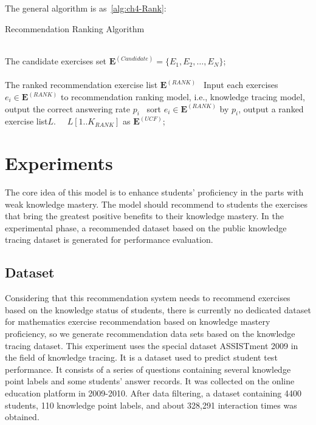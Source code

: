 The general algorithm is as~\ref{alg:ch4-Rank}:
\begin{algorithm}[h]
  \caption{Recommendation Ranking Algorithm}\label{alg:ch4-Rank}
  \begin{algorithmic}
    \REQUIRE~~\\

    The candidate exercises set \(\mathbf{E}^{(Candidate)}=\{E_1,E_2,\ldots,E_N\} \); \\
    \ENSURE~~\\ %
    The ranked recommendation exercise list \(\mathbf{E}^{(RANK)} \)
    \STATE~Input each exercises \(e_i \in \mathbf{E}^{(RANK)} \) to recommendation ranking model, i.e., knowledge tracing model, output the correct answering rate \(p_i\)
    \STATE~sort \(e_i \in \mathbf{E}^{(RANK)} \) by \(p_i\), output a ranked exercise list\(L\).
    \RETURN~~\(L[1..K_{RANK}]\) as \(\mathbf{E}^{(UCF)} \); %
  \end{algorithmic}
\end{algorithm}

\section{Experiments}

The core idea of this model is to enhance students' proficiency in the parts with weak knowledge mastery. The model should recommend to students the exercises that bring the greatest positive benefits to their knowledge mastery. In the experimental phase, a recommended dataset based on the public knowledge tracing dataset is generated for performance evaluation.
\subsection{Dataset}

Considering that this recommendation system needs to recommend exercises based on the knowledge status of students, there is currently no dedicated dataset for mathematics exercise recommendation based on knowledge mastery proficiency, so we generate recommendation data sets based on the knowledge tracing dataset. This experiment uses the special dataset ASSISTment 2009 in the field of knowledge tracing. It is a dataset used to predict student test performance. It consists of a series of questions containing several knowledge point labels and some students' answer records. It was collected on the online education platform in 2009-2010. After data filtering, a dataset containing 4400 students, 110 knowledge point labels, and about 328,291 interaction times was obtained.

